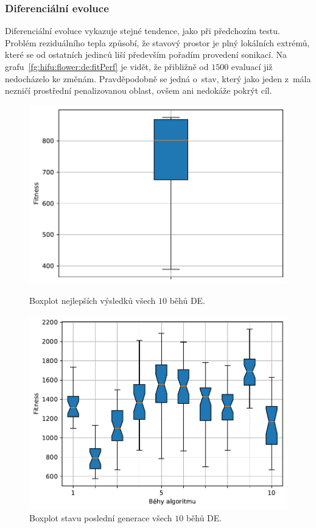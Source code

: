 \subsubsection{Diferenciální evoluce}
Diferenciální evoluce vykazuje stejné tendence, jako při předchozím testu. Problém reziduálního tepla způsobí, že stavový prostor je plný lokálních extrémů, které se od ostatních jedinců liší především pořadím provedení sonikací. Na grafu~\ref{fg:hifu:flower:de:fitPerf} je vidět, že přibližně od $1500$ evaluací již nedocházelo ke změnám. Pravděpodobně se jedná o~stav, který jako jeden z~mála nezničí prostřední penalizovanou oblast, ovšem ani nedokáže pokrýt cíl.

\begin{figure}[H]
\begin{minipage}[t]{0.475\linewidth}
\includegraphics[width=\linewidth]{obrazky-figures/statistics/HIFU/flower/15/DE/bestsBoxplot_WithOutliers.pdf}
\caption{Boxplot nejlepších výsledků všech $10$ běhů DE.}
\label{fg:hifu:flower:de:best}
\end{minipage}
\hfill
\begin{minipage}[t]{0.475\linewidth}
\includegraphics[width=\linewidth]{obrazky-figures/statistics/HIFU/flower/15/DE/lastGenBoxplots.pdf}
\caption{Boxplot stavu poslední generace všech $10$ běhů DE.}
\label{fg:hifu:flower:de:lastGen}
\end{minipage}
\end{figure}


